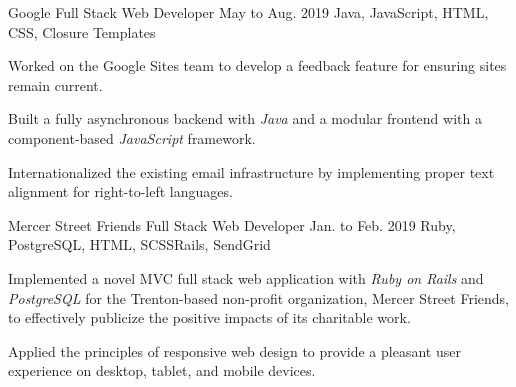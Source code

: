 
\begin{cventry}
    {Google}
    {Full Stack Web Developer}
    {May to Aug. 2019}
    {Java, JavaScript, HTML, CSS, Closure Templates}{}
    \begin{cvitems}
        \item Worked on the Google Sites team to develop a feedback feature for ensuring sites remain current.
        \item Built a fully asynchronous backend with \textsl{Java} and a modular frontend with a component-based \textsl{JavaScript} framework.
        \item Internationalized the existing email infrastructure by implementing proper text alignment for right-to-left languages. 
    \end{cvitems}
\end{cventry}

\begin{comment}
    \begin{cventry}
        {The College of New Jersey (TCNJ)}
        {Computer Science Department Tutor}
        {Apr. 2018 to May 2019}
        {Java, C++, C, Ruby, PostgreSQL, Regular Expressions}{Rails}
        \begin{cvitems}
            \item Tutoring TCNJ students in computer science coursework concerning topics such as object-oriented programming, data structures, discrete math, algorithms, computer architecture, operating systems, databases, and software engineering.
        \end{cvitems}
    \end{cventry}
\end{comment}

\begin{cventry}
    {Mercer Street Friends}
    {Full Stack Web Developer}
    {Jan. to Feb. 2019}
    {Ruby, PostgreSQL, HTML, SCSS}{Rails, SendGrid}
    \begin{cvitems}
        \item Implemented a novel MVC full stack web application with \textsl{Ruby on Rails} and \textsl{PostgreSQL} for the Trenton-based non-profit organization, Mercer Street Friends, to effectively publicize the positive impacts of its charitable work.
        \item Applied the principles of responsive web design to provide a pleasant user experience on desktop, tablet, and mobile devices.
    \end{cvitems}
\end{cventry}

